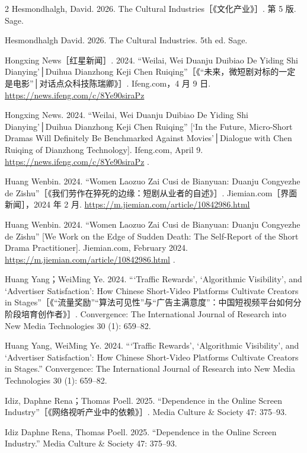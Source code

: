 \documentclass[10pt,a4paper]{article}
\begin{document}
\begin{paracol}{2}
\switchcolumn*
Hesmondhalgh, David. 2026. The Cultural Industries［《文化产业》］. 第 5 版. Sage.\par
\switchcolumn
Hesmondhalgh David. 2026. The Cultural Industries. 5th ed. Sage.\par
\switchcolumn*
Hongxing News［红星新闻］. 2024. “Weilai, Wei Duanju Duibiao De Yiding Shi Dianying’│Duihua Dianzhong Keji Chen Ruiqing”［《“未来，微短剧对标的一定是电影”│对话点众科技陈瑞卿》］. Ifeng.com，4 月 9 日. \url{https://news.ifeng.com/c/8Ye90siraPz}\par
\switchcolumn
Hongxing News. 2024. “Weilai, Wei Duanju Duibiao De Yiding Shi Dianying’│Duihua Dianzhong Keji Chen Ruiqing” [‘In the Future, Micro-Short Dramas Will Definitely Be Benchmarked Against Movies’│Dialogue with Chen Ruiqing of Dianzhong Technology]. Ifeng.com, April 9. \url{https://news.ifeng.com/c/8Ye90siraPz} .\par
\switchcolumn*
Huang Wenbin. 2024. “Women Laozuo Zai Cusi de Bianyuan: Duanju Congyezhe de Zishu”［《我们劳作在猝死的边缘：短剧从业者的自述》］. Jiemian.com［界面新闻］，2024 年 2 月. \url{https://m.jiemian.com/article/10842986.html}\par
\switchcolumn
Huang Wenbin. 2024. “Women Laozuo Zai Cusi de Bianyuan: Duanju Congyezhe de Zishu” [We Work on the Edge of Sudden Death: The Self-Report of the Short Drama Practitioner]. Jiemian.com, February 2024. \url{https://m.jiemian.com/article/10842986.html} .\par
\switchcolumn*
Huang Yang；WeiMing Ye. 2024. “‘Traffic Rewards’, ‘Algorithmic Visibility’, and ‘Advertiser Satisfaction’: How Chinese Short-Video Platforms Cultivate Creators in Stages”［《“流量奖励”“算法可见性”与“广告主满意度”：中国短视频平台如何分阶段培育创作者》］. Convergence: The International Journal of Research into New Media Technologies 30 (1): 659–82.\par
\switchcolumn
Huang Yang, WeiMing Ye. 2024. “‘Traffic Rewards’, ‘Algorithmic Visibility’, and ‘Advertiser Satisfaction’: How Chinese Short-Video Platforms Cultivate Creators in Stages.” Convergence: The International Journal of Research into New Media Technologies 30 (1): 659–82.\par
\switchcolumn*
Idiz, Daphne Rena；Thomas Poell. 2025. “Dependence in the Online Screen Industry”［《网络视听产业中的依赖》］. Media Culture \& Society 47: 375–93.\par
\switchcolumn
Idiz Daphne Rena, Thomas Poell. 2025. “Dependence in the Online Screen Industry.” Media Culture \& Society 47: 375–93.\par

\end{paracol}
\end{document}

